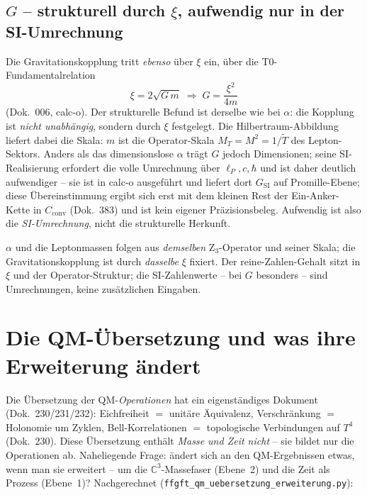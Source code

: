 \subsection{$G$ -- strukturell durch $\xi$, aufwendig nur in der SI-Umrechnung}

Die Gravitationskopplung tritt \emph{ebenso} über $\xi$ ein, über die
T0-Fundamentalrelation
\begin{equation}
  \xi=2\sqrt{G\,m}\;\Longrightarrow\; G=\frac{\xi^2}{4m}
\end{equation}
(Dok.~006, calc-o). Der strukturelle Befund ist derselbe wie bei $\alpha$: die
Kopplung ist \emph{nicht unabhängig}, sondern durch $\xi$ festgelegt. Die
Hilbertraum-Abbildung liefert dabei die Skala: $m$ ist die Operator-Skala
$M_T=M^2=1/\tilde T$ des Lepton-Sektors. Anders als das dimensionslose $\alpha$
trägt $G$ jedoch Dimensionen; seine SI-Realisierung erfordert die volle
Umrechnung über $\ell_P,c,\hbar$ und ist daher deutlich aufwendiger -- sie ist in
calc-o ausgeführt und liefert dort $G_{\text{SI}}$ auf Promille-Ebene; diese Übereinstimmung ergibt sich erst mit dem kleinen Rest der Ein-Anker-Kette in $C_{\text{conv}}$ (Dok.~383) und ist kein eigener Präzisionsbeleg.
Aufwendig ist also die \emph{SI-Umrechnung}, nicht die strukturelle Herkunft.

\begin{keyresult}
$\alpha$ und die Leptonmassen folgen aus \emph{demselben} Z$_3$-Operator und
seiner Skala; die Gravitationskopplung ist durch \emph{dasselbe} $\xi$ fixiert.
Der reine-Zahlen-Gehalt sitzt in $\xi$ und der Operator-Struktur; die
SI-Zahlenwerte -- bei $G$ besonders -- sind Umrechnungen, keine zusätzlichen
Eingaben.
\end{keyresult}

\section{Die QM-Übersetzung und was ihre Erweiterung ändert}

Die Übersetzung der QM-\emph{Operationen} hat ein eigenständiges Dokument
(Dok.~230/231/232): Eichfreiheit $=$ unitäre Äquivalenz, Verschränkung $=$
Holonomie um Zyklen, Bell-Korrelationen $=$ topologische Verbindungen auf $T^4$
(Dok.~230). Diese Übersetzung enthält \emph{Masse und Zeit nicht} -- sie bildet
nur die Operationen ab. Naheliegende Frage: ändert sich an den QM-Ergebnissen
etwas, wenn man sie erweitert -- um die $\mathbb{C}^3$-Massefaser (Ebene~2) und
die Zeit als Prozess (Ebene~1)? Nachgerechnet
(\texttt{ffgft\_qm\_uebersetzung\_erweiterung.py}):

